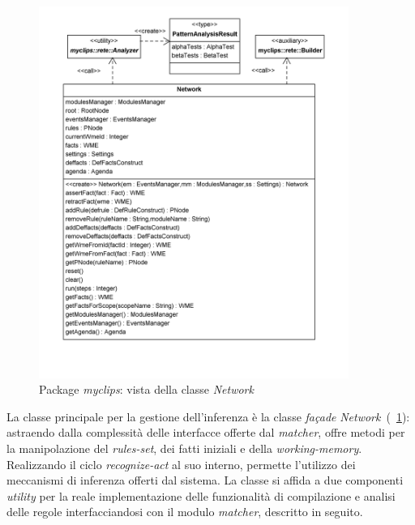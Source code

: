 \begin{figure}
\centering
\includegraphics[width=0.9\textwidth]{Immagini/Capitolo3/Classi/myclips_rete_Network.png}
\caption{Package \emph{myclips}: vista della classe \emph{Network}}\label{fig:class-myclips-network}
\end{figure}

La classe principale per la gestione dell'inferenza è la classe \emph{fa\c{c}ade} \emph{Network}~(\figurename~\ref{fig:class-myclips-network}): astraendo dalla complessità delle interfacce offerte dal \emph{matcher}, offre metodi per la manipolazione del \emph{rules-set}, dei fatti iniziali e della \emph{working-memory}. Realizzando il ciclo \emph{recognize-act} al suo interno, permette l'utilizzo dei meccanismi di inferenza offerti dal sistema. La classe si affida a due componenti \emph{utility} per la reale implementazione delle funzionalità di compilazione e analisi delle regole interfacciandosi con il modulo \emph{matcher}, descritto in seguito.


